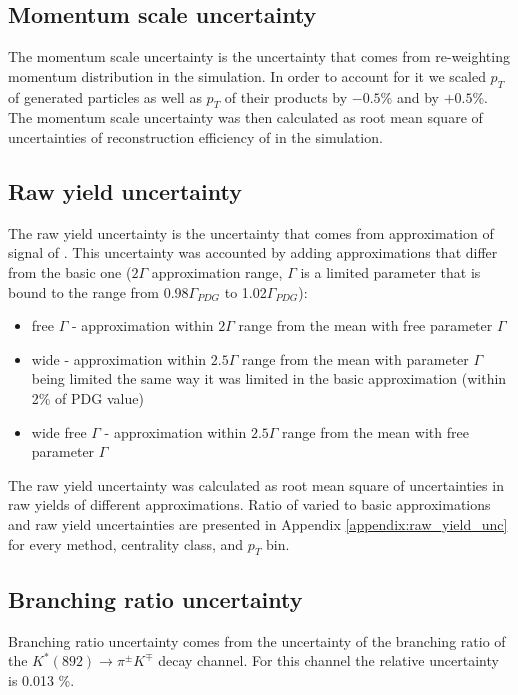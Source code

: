 \subsection{Momentum scale uncertainty}

The momentum scale uncertainty is the uncertainty that comes from re-weighting momentum distribution in the simulation. In order to account for it we scaled $p_T$ of generated particles as well as $p_T$ of their products by $-0.5\%$ and by $+0.5\%$. The momentum scale uncertainty was then calculated as root mean square of uncertainties of reconstruction efficiency of \Kstar in the simulation.

\subsection{Raw yield uncertainty}

The raw yield uncertainty is the uncertainty that comes from approximation of signal of \Kstar. This uncertainty was accounted by adding approximations that differ from the basic one ($2\Gamma$ approximation range, $\Gamma$ is a limited parameter that is bound to the range from 0.98$\Gamma_{PDG}$ to 1.02$\Gamma_{PDG}$):
\begin{itemize}
	\item free $\Gamma$ - approximation within $2\Gamma$ range from the mean with free parameter $\Gamma$
	\item wide - approximation within $2.5 \Gamma$ range from the mean with parameter $\Gamma$ being limited the same way it was limited in the basic approximation (within 2\% of PDG value)
	\item wide free $\Gamma$ - approximation within $2.5\Gamma$ range from the mean with free parameter $\Gamma$
\end{itemize}

The raw yield uncertainty was calculated as root mean square of uncertainties in raw yields of different approximations. Ratio of varied to basic approximations and raw yield uncertainties are presented in Appendix \ref{appendix:raw_yield_unc} for every method, centrality class, and $p_T$ bin.

\subsection{Branching ratio uncertainty}

Branching ratio uncertainty comes from the uncertainty of the branching ratio of the $K^*(892) \rightarrow \pi^\pm K^\mp$ decay channel. For this channel the relative uncertainty is 0.013 \%.

